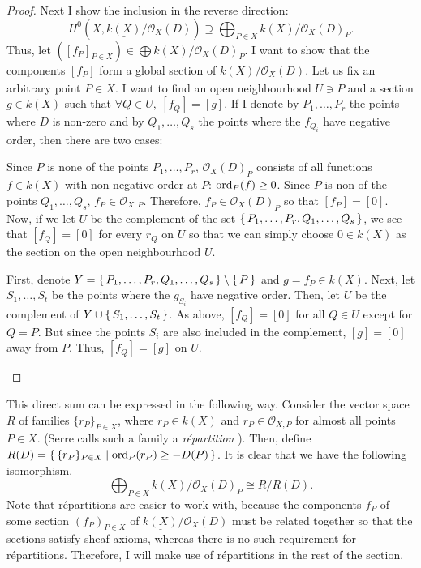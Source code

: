 \begin{proof}
  Next I show the inclusion in the reverse direction:
  \[
    H^{0}(X,\underline{k(X)}/\mathscr{O}_X(D))\supseteq\bigoplus_{P\in X}
    k(X)/\mathscr{O}_X(D)_{P}.
  \]
  Thus, let $([f_{P}]_{P\in X})\in\displaystyle\bigoplus
  k(X)/\mathscr{O}_X(D)_{P}$. I want to show that the components $[f_{P}]$
  form a global section of $\underline{k(X)}/\mathscr{O}_X(D)$. Let us
  fix an arbitrary point $P\in X$. I want to find an open neighbourhood
  $U\ni P$ and a section $g\in k(X)$ such that $\forall Q\in U,\ [f_{Q}]=[g]$.
  If I denote by $P_{1},\ldots,P_{r}$ the points where $D$ is non-zero
  and by $Q_{1},\ldots,Q_{s}$ the points where the $f_{Q_{i}}$ have negative
  order, then there are two cases:
  \begin{description}[style=nextline]
    \item[$P\not\in\set{P_{1},\ldots,P_{r},Q_{1},\ldots,Q_{s}}\big)$]
          Since $P$ is none of the points $P_{1},\ldots,P_{r}$,
          $\mathscr{O}_X(D)_{P}$ consists of all functions $f\in k(X)$
          with non-negative order at $P$: $\operatorname{ord}_{P}(f)\geq 0$.
          Since $P$ is non of the points $Q_{1},\ldots,Q_{s}$,
          $f_{P}\in\mathscr{O}_{X,P}$. Therefore, $f_{P}\in\mathscr{O}_X(D)_{P}$
          so that $[f_{P}]=[0]$. Now, if we let $U$ be the complement of
          the set $\set{P_{1},\ldots,P_{r},Q_{1},\ldots,Q_{s}}$, we see
          that $[f_{Q}]=[0]$ for every $r_{Q}$ on $U$ so that we can simply
          choose $0\in k(X)$ as the section on the open neighbourhood $U$.
    \item[$P\in\set{P_{1},\ldots,P_{r},Q_{1},\ldots,Q_{s}}\big)$]
          First, denote $Y=\set{P_{1},\ldots,P_{r},Q_{1},\ldots,Q_{s}}
          \setminus \set{P}$ and $g=f_{P}\in k(X)$. Next, let
          $S_{1},\ldots,S_{t}$ be the points where the $g_{S_{i}}$ have
          negative order. Then, let $U$ be the complement of
          $Y\cup \set{S_{1},\ldots,S_{t}}$. As above, $[f_{Q}]=[0]$ for all
          $Q\in U$ except for $Q=P$. But since the points $S_{i}$ are also
          included in the complement, $[g]=[0]$ away from $P$. Thus,
          $[f_{Q}]=[g]$ on $U$.
  \end{description}
\end{proof}
This direct sum can be expressed in the following way. Consider the
vector space $R$ of families $\{r_{P}\}_{P\in X}$, where $r_{P}\in k(X)$ and
$r_{P}\in\mathscr{O}_{X,P}$ for almost all points $P\in X$.
(Serre calls such a family a \emph{r\'epartition} \cite{serre}).
Then, define $R(D)=\set{\{r_{P}\}_{P\in X}\mid \operatorname{ord}_{P}(r_{P})\geq -D(P)}$.
It is clear that we have the following isomorphism.
\[
  \bigoplus_{P\in X}k(X)/\mathscr{O}_X(D)_{P}\cong R/R(D).
\]
Note that r\'epartitions are easier to work with, because the components
$f_{P}$ of some section $(f_{P})_{P\in X}$ of
$\underline{k(X)}/\mathscr{O}_X(D)$ must be related together so that the
sections satisfy sheaf axioms, whereas there is no such requirement for
r\'epartitions. Therefore, I will make use of r\'epartitions in the rest
of the section.

